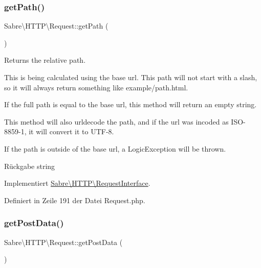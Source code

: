 \subsubsection{\texorpdfstring{get\+Path()}{getPath()}}
{\footnotesize\ttfamily Sabre\textbackslash{}\+H\+T\+T\+P\textbackslash{}\+Request\+::get\+Path (\begin{DoxyParamCaption}{ }\end{DoxyParamCaption})}

Returns the relative path.

This is being calculated using the base url. This path will not start with a slash, so it will always return something like \textquotesingle{}example/path.\+html\textquotesingle{}.

If the full path is equal to the base url, this method will return an empty string.

This method will also urldecode the path, and if the url was incoded as I\+S\+O-\/8859-\/1, it will convert it to U\+T\+F-\/8.

If the path is outside of the base url, a Logic\+Exception will be thrown.

\begin{DoxyReturn}{Rückgabe}
string 
\end{DoxyReturn}


Implementiert \mbox{\hyperlink{interface_sabre_1_1_h_t_t_p_1_1_request_interface_aea4dd5571c841fa1e41b05813299bae4}{Sabre\textbackslash{}\+H\+T\+T\+P\textbackslash{}\+Request\+Interface}}.



Definiert in Zeile 191 der Datei Request.\+php.

\mbox{\label{class_sabre_1_1_h_t_t_p_1_1_request_ae81960877721a46ebe6fd90084a18a62}} 
\subsubsection{\texorpdfstring{get\+Post\+Data()}{getPostData()}}
{\footnotesize\ttfamily Sabre\textbackslash{}\+H\+T\+T\+P\textbackslash{}\+Request\+::get\+Post\+Data (\begin{DoxyParamCaption}{ }\end{DoxyParamCaption})}

